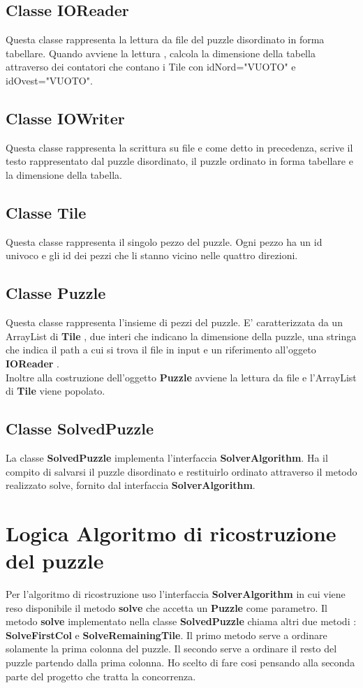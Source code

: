 \documentclass[11pt]{article}
\begin{document}
\subsection{Classe IOReader}
Questa classe rappresenta la lettura da file del puzzle disordinato in forma tabellare. Quando avviene la lettura , calcola la dimensione della tabella attraverso dei contatori che contano i Tile con idNord="VUOTO" e idOvest="VUOTO".
\subsection{Classe IOWriter}
Questa classe rappresenta la scrittura su file e come detto in precedenza, scrive il testo rappresentato dal puzzle disordinato, il puzzle ordinato in forma tabellare e la dimensione della tabella.
\subsection{Classe Tile}
Questa classe rappresenta il singolo pezzo del puzzle. Ogni pezzo ha un id univoco e gli id dei pezzi che li stanno vicino nelle quattro direzioni. 
\subsection{Classe Puzzle}
Questa classe rappresenta l'insieme di pezzi del puzzle. E' caratterizzata da un ArrayList di \textbf{Tile} , due interi che indicano la dimensione della puzzle, una stringa che indica il path a cui si trova il file in input e un riferimento all'oggeto \textbf{IOReader }.\\
Inoltre alla costruzione dell'oggetto \textbf{Puzzle} avviene la lettura da file e l'ArrayList di \textbf{Tile} viene popolato.
\subsection{Classe SolvedPuzzle}
La classe \textbf{SolvedPuzzle} implementa l'interfaccia \textbf{SolverAlgorithm}. Ha il compito di salvarsi il puzzle disordinato e restituirlo ordinato attraverso il metodo realizzato solve, fornito dal interfaccia \textbf{SolverAlgorithm}. 
\section{Logica Algoritmo di ricostruzione del puzzle}
Per l'algoritmo di ricostruzione uso l'interfaccia \textbf{SolverAlgorithm} in cui viene reso disponibile il metodo \textbf{solve} che accetta un \textbf{Puzzle} come parametro. Il metodo \textbf{solve} implementato nella classe \textbf{SolvedPuzzle} chiama altri due metodi : \textbf{SolveFirstCol} e \textbf{SolveRemainingTile}. Il primo metodo serve a ordinare solamente la prima colonna del puzzle. Il secondo serve a ordinare il resto del puzzle partendo dalla prima colonna. Ho scelto di fare cosi pensando alla seconda parte del progetto che tratta la concorrenza.
\end{document}
